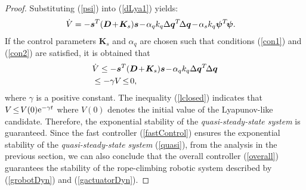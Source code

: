 \documentclass[letterpaper, 10 pt, conference]{ieeeconf}
\begin{document}
\begin{proof}
Substituting (\ref{psi}) into (\ref{dLya1}) yields:
\begin{eqnarray}
&\dot V=-\bm s^T(\bm D\hspace{-0.05cm}+\hspace{-0.05cm}\bm K_s)\bm
s\hspace{-0.05cm}-\hspace{-0.05cm}\alpha_q k_q\Delta\bm q^T\hspace{-0.05cm}\Delta\bm q\hspace{-0.05cm}-\hspace{-0.05cm}\alpha_s k_q\bm \psi^T\hspace{-0.05cm}\bm \psi.
\end{eqnarray}
If the control parameters $\bm K_s$ and $\alpha_q$ are chosen such that conditions (\ref{con1}) and (\ref{con2}) are satisfied, it is obtained that
\begin{eqnarray}
&\dot V\leq -\bm s^T(\bm D\hspace{-0.05cm}+\hspace{-0.05cm}\bm K_s)\bm
s\hspace{-0.05cm}-\hspace{-0.05cm}\alpha_q k_q\Delta\bm q^T\hspace{-0.05cm}\Delta\bm q\nonumber\\
&\leq-\gamma
V\hspace{-0.05cm}\leq\hspace{-0.05cm}0,\label{lclosed}
\end{eqnarray}
where $\gamma$ is a positive constant. The inequality
(\ref{lclosed}) indicates that
$V\hspace{-0.05cm}\leq\hspace{-0.05cm}V(0){\rm e}^{-\gamma t}$ where
$V(0)$ denotes the initial value of the Lyapunov-like candidate.
Therefore, the exponential stability of the {\em quasi-steady-state
system} is guaranteed. Since the fast controller (\ref{fastControl}) ensures the exponential
stability of the {\em quasi-steady-state system} (\ref{quasi}), from
the analysis in the previous section, we can also conclude that the
overall controller (\ref{overall}) guarantees the stability of the
rope-climbing robotic system described by (\ref{grobotDyn}) and
(\ref{gactuatorDyn}).


\end{proof}
\end{document}

